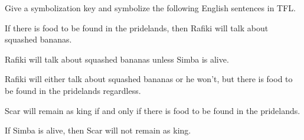 \begin{practiceproblems}
\problempart Give a symbolization key and symbolize the following English sentences in TFL.
\begin{problemslist}
\item If there is food to be found in the pridelands, then Rafiki will talk about squashed bananas.
\item Rafiki will talk about squashed bananas unless Simba is alive.
\item Rafiki will either talk about squashed bananas or he won't, but there is food to be found in the pridelands regardless.
\item Scar will remain as king if and only if there is food to be found in the pridelands.
\item If Simba is alive, then Scar will not remain as king.
\end{problemslist}



\end{practiceproblems}
